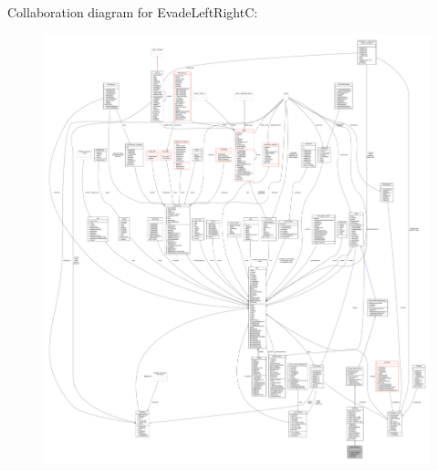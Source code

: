Collaboration diagram for Evade\+Left\+RightC\+:
\nopagebreak
\begin{figure}[H]
\begin{center}
\leavevmode
\includegraphics[width=350pt]{d8/df4/classEvadeLeftRightC__coll__graph}
\end{center}
\end{figure}
